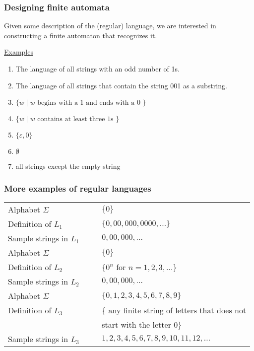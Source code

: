 \documentclass[xcolor=table]{beamer}
\begin{document}
\begin{frame}
  \frametitle{Designing finite automata}

  Given some description of the (regular) language, we are interested
  in constructing a finite automaton that recognizes it.
  
  \bigskip
  \underline{Examples}

  \begin{enumerate}
  \item The language of all strings with an odd number of
    1s.
  \item The language of all strings that contain the string 001 as a
  substring.
  \item $\{ w \; | \; w \mbox{ begins with a 1 and ends with a 0 } \}$
  \item $\{ w \; | \; w \mbox{ contains at least three 1s } \}$
  \item $\{ \varepsilon, 0 \}$
  \item $\emptyset$
  \item all strings except the empty string
  \end{enumerate}
  
\end{frame}

\begin{frame}
  \frametitle{More examples of regular languages}

  \begin{tabular}{ll}
  Alphabet $\Sigma$ &   $\{ 0 \}$\\
  Definition of $L_1$ &   $\{ 0, 00, 000, 0000, \ldots \}$ \\
  Sample strings in $L_1$ \ \ \  & $0, 00, 000, \ldots$ \\[1ex] \hline
  Alphabet $\Sigma$ &   $\{ 0 \}$\\
  Definition of $L_2$ &   $\{ 0^n$ for $n =1, 2, 3, \ldots \}$ \\
  Sample strings in $L_2$ & $0, 00, 000, \ldots$ \\[1ex] \hline
  Alphabet $\Sigma$ &   $\{ 0,1,2,3,4,5,6,7,8,9 \}$ \\
  Definition of $L_3$ &   $\{$ any finite string of letters that does not \\
  & start with the letter $0 \}$ \\
  Sample strings in $L_3$ & $1,2,3,4,5,6,7,8,9,10,11,12,\ldots$
  \end{tabular}
  
\end{frame}
\end{document}
